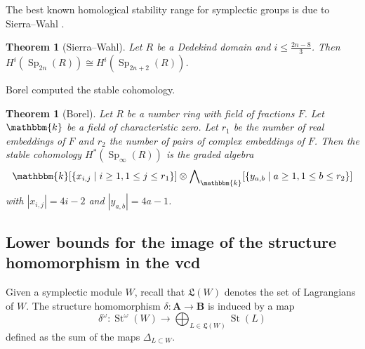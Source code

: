 \documentclass[11pt,letterpaper]{amsart}
\newcommand{\bk}{\mathbbm{k}}
\DeclareMathOperator{\Sp}{Sp}
\newcommand{\HH}{\mathbf{B}}
\newcommand{\HA}{\mathbf{A}}
\newcommand{\fL}{\mathfrak{L}}
\numberwithin{theoremcounter}{section}
\newtheorem{theorem}[theoremauto]{Theorem}
\theoremstyle{definition}
\theoremstyle{remark}
\DeclareMathOperator{\St}{St}
\begin{document}
The best known homological stability range for symplectic groups is due to Sierra–Wahl \cite{SierraWahl}. 

\begin{theorem}[Sierra–Wahl] \label{SW}
    Let $R$ be a Dedekind domain and $i \leq \frac{2n-8}{3}$. Then $H^i(\Sp_{2n}(R)) \cong H^i(\Sp_{2n+2}(R))$. 
\end{theorem}

Borel \cite{Bor} computed the stable cohomology. 

\begin{theorem}[Borel] \label{Borel}  Let $R$ be a number ring with field of fractions $F$. Let $\bk$ be a field of characteristic zero. Let $r_1$ be the number of real embeddings of $F$ and $r_2$ the number of pairs of complex embeddings of $F$.
Then the stable cohomology $H^*(\Sp_{\infty}(R))$ is the graded algebra $$\bk[\{x_{i,j} \mid i\ge 1, 1\le j \le r_1\}] \otimes {\bigwedge}_{\bk}[\{y_{a,b}\mid a\ge 1, 1\le b \le r_2 \}]$$ with $|x_{i,j}|=4i-2$ and $|y_{a,b}|=4a-1$.
\end{theorem}








\subsection{Lower bounds for the image of the structure homomorphism in the vcd}

Given a symplectic module $W$, recall that $\fL(W)$ denotes the set of Lagrangians of $W$. The structure homomorphism $\delta:\HA \to \HH$ is induced by a map
$$\delta^\omega\colon \St^\omega(W) \longrightarrow \bigoplus_{L \in \fL(W)} \St(L)$$ defined as the sum of the maps $\Delta_{L \subset W}$.
\end{document}
